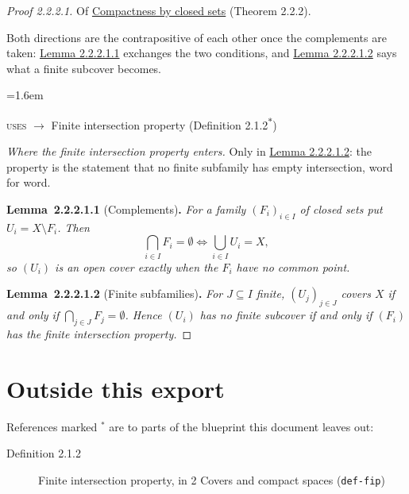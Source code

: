 \documentclass[11pt]{article}
\newenvironment{bpstatement}[2]{\par\addvspace{0.6\baselineskip}\noindent\textbf{#1}#2\textbf{.}\enspace\ignorespaces}
  {\par\addvspace{0.4\baselineskip}}
\newenvironment{bpstatementit}[2]{\begin{bpstatement}{#1}{#2}\itshape\ignorespaces}{\end{bpstatement}}
\newenvironment{bpstep}[1]{\par\addvspace{0.3\baselineskip}\begin{list}{}{\leftmargin=1.6em\rightmargin=0pt\topsep=0pt}\item\relax
  {\small\color{bpmuted}#1}\par\nopagebreak}{\end{list}\par}
\newcommand{\bpout}[1]{#1\textsuperscript{\hyperlink{bp-outside}{\ensuremath{\ast}}}}
\newcommand{\bpslug}[1]{\texttt{#1}}
\begin{document}
\begin{proof}[{Proof 2.2.2.1}]
{\small\color{bpmuted}Of \hyperref[bp1]{Compactness by closed sets} (Theorem 2.2.2).}\par
Both directions are the contrapositive of each other once the complements are taken: \hyperref[bp3]{Lemma 2.2.2.1.1} exchanges the two conditions, and \hyperref[bp4]{Lemma 2.2.2.1.2} says what a finite subcover becomes.
\begin{bpstep}{\textsc{uses} \ensuremath{\to} Finite intersection property (\bpout{Definition 2.1.2})}\label{bp5}%
\textit{Where the finite intersection property enters.}
Only in \hyperref[bp4]{Lemma 2.2.2.1.2}: the property is the statement that no finite subfamily has empty intersection, word for word.
\end{bpstep}
\label{bp3}%
\begin{bpstatementit}{Lemma~2.2.2.1.1}{ (Complements)}
For a family \((F_i)_{i \in I}\) of closed sets put \(U_i = X \setminus F_i\). Then \[
\bigcap_{i \in I} F_i = \emptyset
\iff
\bigcup_{i \in I} U_i = X ,
\] so \((U_i)\) is an open cover exactly when the \(F_i\) have no common point.
\end{bpstatementit}

\label{bp4}%
\begin{bpstatementit}{Lemma~2.2.2.1.2}{ (Finite subfamilies)}
For \(J \subseteq I\) finite, \((U_j)_{j \in J}\) covers \(X\) if and only if \(\bigcap_{j \in J} F_j = \emptyset\).  Hence \((U_i)\) has no finite subcover if and only if \((F_i)\) has the finite intersection property.
\end{bpstatementit}

\end{proof}


\bigskip{}\hypertarget{bp-outside}{}%
\section*{Outside this export}
References marked \ensuremath{{}^\ast} are to parts of the blueprint this document leaves out:
\begin{description}
\item[Definition 2.1.2] Finite intersection property, in 2 Covers and compact spaces (\bpslug{def-{}\allowbreak{}fip})
\end{description}
\end{document}

